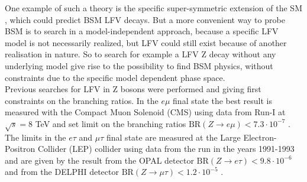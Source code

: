 One example of such a theory is the specific super-symmetric extension of the \gls{SM} \cite{SUSYLFV}, which could predict \gls{BSM} \gls{LFV} decays. But a more convenient way to probe \gls{BSM} is to search in a model-independent approach, because a specific \gls{LFV} model is not necessarily realized, but \gls{LFV} could still exist because of another realisation in nature. So to search for example a \gls{LFV} Z decay without any underlying model give rise to the possibility to find \gls{BSM} physics, without constraints due to the specific model dependent phase space. \\

Previous searches for \gls{LFV} in Z bosons were performed and giving first constraints on the branching ratios. In the $e\mu$ final state the best result is measured with the Compact Muon Solenoid (\gls{CMS}) using data from Run-I at $\sqrt{s} = 8$ TeV and set limit on the branching ratios $\text{BR}(Z\to e\mu) < 7.3\cdot 10^{-7}$ \cite{LFVEMU}. The limits in the $e\tau$ and $\mu\tau$ final state are measured at the Large Electron-Positron Collider (\gls{LEP}) \cite{LEP} collider using data from the run in the years 1991-1993 and are given by the result from the OPAL detector $\text{BR}(Z\to e\tau) < 9.8\cdot 10^{-6}$ \cite{LFVETAU} and from the DELPHI detector $\text{BR}(Z\to \mu\tau) < 1.2\cdot 10^{-5}$ \cite{LFVMUTAU}.
